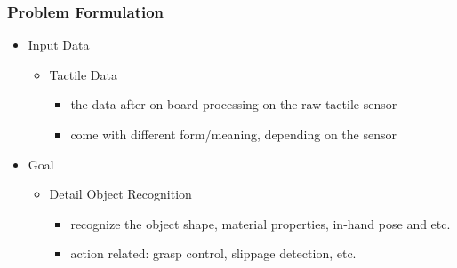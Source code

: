 \subsubsection{Problem Formulation}
\begin{itemize}
\item Input Data
	\begin{itemize}
	\item Tactile Data
		\begin{itemize}
		\item the data after on-board processing on the raw tactile sensor
		\item come with different form/meaning, depending on the sensor
		\end{itemize}
	\end{itemize}
\item Goal
	\begin{itemize}
	\item Detail Object Recognition
		\begin{itemize}
		\item recognize the object shape, material properties, in-hand pose and etc.
		\item action related: grasp control, slippage detection, etc.
		\end{itemize}
	\end{itemize}
\end{itemize}
